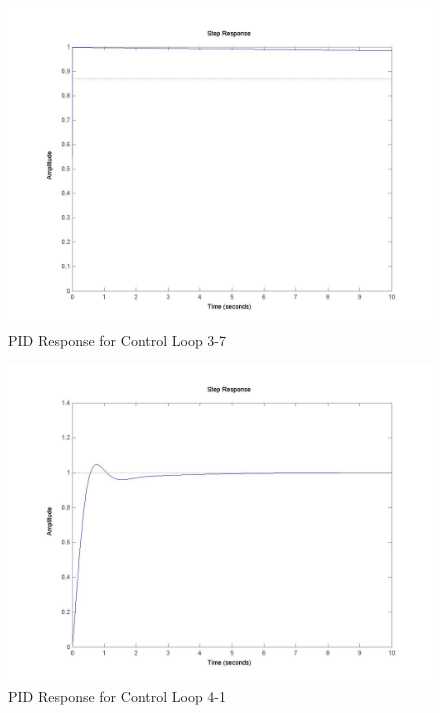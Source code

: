 	\begin{figure}[H]
		\includegraphics[width=\textwidth]{part3-7.jpg}
		\caption{PID Response for Control Loop 3-7}
	\end{figure}
	
	\begin{figure}[H]
		\includegraphics[width=\textwidth]{part4-1.jpg}
		\caption{PID Response for Control Loop 4-1}
	\end{figure}
	
